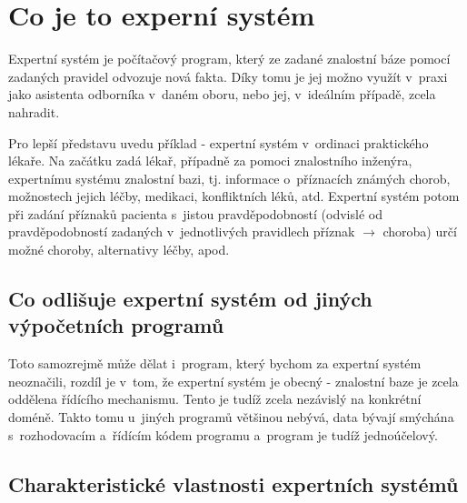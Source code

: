 \section{Co je to experní systém}
Expertní systém je počítačový program, který ze zadané znalostní báze pomocí
zadaných pravidel odvozuje nová fakta. Díky tomu je jej možno využít v~praxi
jako asistenta odborníka v~daném oboru, nebo jej, v~ideálním případě, zcela
nahradit.

Pro lepší představu uvedu příklad - expertní systém v~ordinaci
praktického lékaře. Na začátku zadá lékař, případně za pomoci znalostního
inženýra, expertnímu systému znalostní bazi, tj. informace o~příznacích
známých chorob, možnostech jejich léčby, medikaci, konfliktních léků, atd.
Expertní systém potom při zadání příznaků pacienta s~jistou pravděpodobností
(odvislé od pravděpodobností zadaných v~jednotlivých pravidlech příznak
$\rightarrow$ choroba) určí možné choroby, alternativy léčby, apod.

\subsection{Co odlišuje expertní systém od jiných výpočetních programů}
Toto samozrejmě může dělat i~program, který bychom za expertní systém
neoznačili, rozdíl je v~tom, že expertní systém je obecný - znalostní
baze je zcela oddělena řídícího mechanismu. Tento je tudíž zcela
nezávislý na konkrétní doméně. Takto tomu u~jiných programů většinou
nebývá, data bývají smýchána s~rozhodovacím a~řídícím kódem programu
a~program je tudíž jednoúčelový.

\subsection{Charakteristické vlastnosti expertních systémů}
